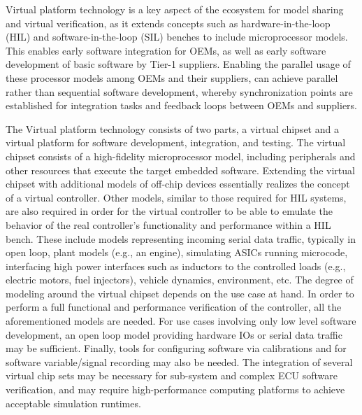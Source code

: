 Virtual platform technology is a key aspect of the ecosystem for model sharing and virtual verification,
as it extends concepts such as hardware-in-the-loop (HIL) and software-in-the-loop (SIL) benches to include microprocessor models.
This enables early software integration for OEMs,
as well as early software development of basic software by Tier-1 suppliers.
Enabling the parallel usage of these processor models among OEMs and their suppliers,
can achieve parallel rather than sequential software development,
whereby synchronization points are established for integration tasks and feedback loops between OEMs and suppliers.

The Virtual platform technology consists of two parts, a virtual chipset and a virtual platform for software development, integration, and testing.
The virtual chipset consists of a high-fidelity microprocessor model,
including peripherals and other resources that execute the target embedded software.
Extending the virtual chipset with additional models of off-chip devices essentially realizes the concept of a virtual controller.
Other models, similar to those required for HIL systems, are also required in order for the virtual controller to be able to emulate the behavior of the real controller's functionality and performance within a HIL bench.
These include models representing incoming serial data traffic, typically in open loop,
plant models (e.g., an engine), simulating ASICs running microcode, interfacing high power interfaces such as inductors to the controlled loads (e.g., electric motors, fuel injectors),
vehicle dynamics, environment, etc.
The degree of modeling around the virtual chipset depends on the use case at hand.
In order to perform a full functional and performance verification of the controller, all the aforementioned models are needed.
For use cases involving only low level software development, an open loop model providing hardware IOs or serial data traffic may be sufficient.
Finally, tools for configuring software via calibrations and for software variable/signal recording may also be needed.
The integration of several virtual chip sets may be necessary for sub-system and complex ECU software verification, and may require high-performance computing platforms to achieve acceptable simulation runtimes.